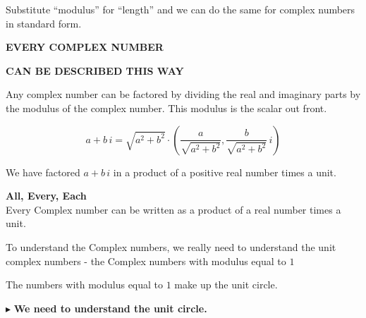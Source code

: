 \documentclass{ximera}
\begin{document}
Substitute ``modulus'' for ``length'' and we can do the same for complex numbers in standard form. \\ 






\begin{center}

\textbf{\textcolor{purple!50!blue!90!black}{EVERY COMPLEX NUMBER}}

\textbf{\textcolor{purple!50!blue!90!black}{CAN BE DESCRIBED THIS WAY}}

\end{center}




Any complex number can be factored by dividing the real and imaginary parts by the modulus of the complex number.  This modulus is the scalar out front.




\[     a + b \, i    =  \sqrt{a^2 + b^2}  \cdot \left(  \frac{a}{\sqrt{a^2 + b^2}}, \frac{b}{\sqrt{a^2 + b^2}} \, i \right)                      \]


We have factored $a + b \, i $ in a product of a positive real number times a unit. \\

















\begin{summary} \textbf{\textcolor{red!80!black}{All, Every, Each}}  \\

Every Complex number can be written as a product of a real number times a unit.


To understand the Complex numbers, we really need to understand the unit complex numbers - the Complex numbers with modulus equal to $1$


The numbers with modulus equal to $1$ make up the unit circle.


$\blacktriangleright$ \textbf{We need to understand the unit circle.}

\end{summary}
\end{document}
